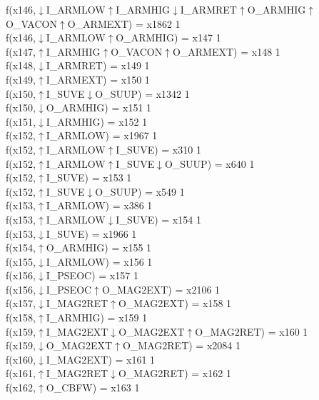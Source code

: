 f(x146,$\downarrow$I\_ARMLOW$\uparrow$I\_ARMHIG$\downarrow$I\_ARMRET$\uparrow$O\_ARMHIG$\uparrow$O\_VACON$\uparrow$O\_ARMEXT) = x1862 {1} \\
f(x146,$\downarrow$I\_ARMLOW$\uparrow$O\_ARMHIG) = x147 {1} \\
f(x147,$\uparrow$I\_ARMHIG$\uparrow$O\_VACON$\uparrow$O\_ARMEXT) = x148 {1} \\
f(x148,$\downarrow$I\_ARMRET) = x149 {1} \\
f(x149,$\uparrow$I\_ARMEXT) = x150 {1} \\
f(x150,$\uparrow$I\_SUVE$\downarrow$O\_SUUP) = x1342 {1} \\
f(x150,$\downarrow$O\_ARMHIG) = x151 {1} \\
f(x151,$\downarrow$I\_ARMHIG) = x152 {1} \\
f(x152,$\uparrow$I\_ARMLOW) = x1967 {1} \\
f(x152,$\uparrow$I\_ARMLOW$\uparrow$I\_SUVE) = x310 {1} \\
f(x152,$\uparrow$I\_ARMLOW$\uparrow$I\_SUVE$\downarrow$O\_SUUP) = x640 {1} \\
f(x152,$\uparrow$I\_SUVE) = x153 {1} \\
f(x152,$\uparrow$I\_SUVE$\downarrow$O\_SUUP) = x549 {1} \\
f(x153,$\uparrow$I\_ARMLOW) = x386 {1} \\
f(x153,$\uparrow$I\_ARMLOW$\downarrow$I\_SUVE) = x154 {1} \\
f(x153,$\downarrow$I\_SUVE) = x1966 {1} \\
f(x154,$\uparrow$O\_ARMHIG) = x155 {1} \\
f(x155,$\downarrow$I\_ARMLOW) = x156 {1} \\
f(x156,$\downarrow$I\_PSEOC) = x157 {1} \\
f(x156,$\downarrow$I\_PSEOC$\uparrow$O\_MAG2EXT) = x2106 {1} \\
f(x157,$\downarrow$I\_MAG2RET$\uparrow$O\_MAG2EXT) = x158 {1} \\
f(x158,$\uparrow$I\_ARMHIG) = x159 {1} \\
f(x159,$\uparrow$I\_MAG2EXT$\downarrow$O\_MAG2EXT$\uparrow$O\_MAG2RET) = x160 {1} \\
f(x159,$\downarrow$O\_MAG2EXT$\uparrow$O\_MAG2RET) = x2084 {1} \\
f(x160,$\downarrow$I\_MAG2EXT) = x161 {1} \\
f(x161,$\uparrow$I\_MAG2RET$\downarrow$O\_MAG2RET) = x162 {1} \\
f(x162,$\uparrow$O\_CBFW) = x163 {1} \\

